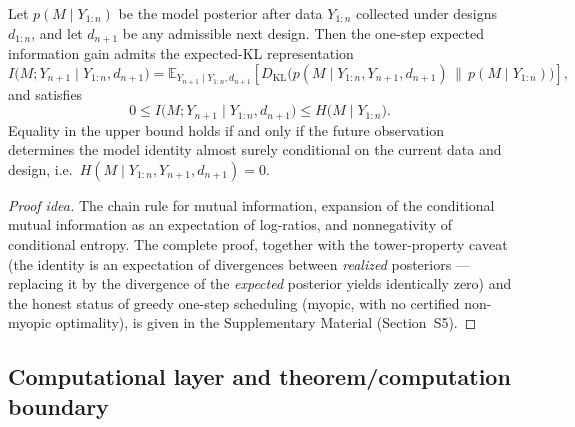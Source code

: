 \begin{theorem}
\label{thm:T19}
Let $p(M \mid Y_{1:n})$ be the model posterior after data $Y_{1:n}$ collected under designs $d_{1:n}$, and let $d_{n+1}$ be any admissible next design. Then the one-step expected information gain admits the expected-KL representation
\begin{equation}
I\bigl(M; Y_{n+1} \mid Y_{1:n}, d_{n+1}\bigr)
=
\mathbb{E}_{Y_{n+1} \mid Y_{1:n}, d_{n+1}}
\!\left[
D_{\mathrm{KL}}\!\bigl(
p(M \mid Y_{1:n}, Y_{n+1}, d_{n+1})
\,\big\|\,
p(M \mid Y_{1:n})
\bigr)
\right],
\label{eq:bayes_seq}
\end{equation}
and satisfies
\begin{equation}
0 \le I\bigl(M; Y_{n+1} \mid Y_{1:n}, d_{n+1}\bigr)
\le H\!\bigl(M \mid Y_{1:n}\bigr).
\label{eq:bayes_seq_bound}
\end{equation}
Equality in the upper bound holds if and only if the future observation determines the model identity almost surely conditional on the current data and design, i.e.\ $H(M \mid Y_{1:n}, Y_{n+1}, d_{n+1}) = 0$.
\end{theorem}
\begin{proof}[Proof idea]
The chain rule for mutual information, expansion of the conditional mutual information as an expectation of log-ratios, and nonnegativity of conditional entropy. The complete proof, together with the tower-property caveat (the identity is an expectation of divergences between \emph{realized} posteriors --- replacing it by the divergence of the \emph{expected} posterior yields identically zero) and the honest status of greedy one-step scheduling (myopic, with no certified non-myopic optimality), is given in the Supplementary Material (Section~S5).
\end{proof}

\subsection{Computational layer and theorem/computation boundary}

